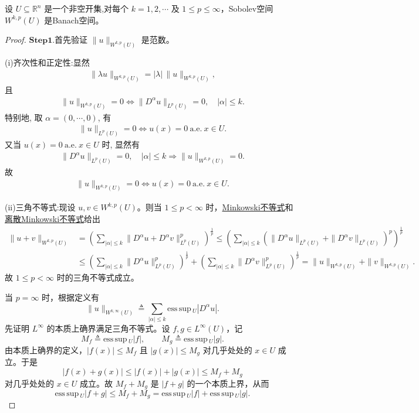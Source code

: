 \documentclass[../../main.tex]{subfiles}
\begin{document}
\begin{theorem}[Sobolev空间都是Banach空间]\label{theorem:ch05-WkpBanach}
设 $U \subseteq \mathbb{R}^n$ 是一个非空开集,对每个 $k=1,2,\cdots$ 及 $1\leqslant p\leqslant\infty$，Sobolev空间 $W^{k,p}(U)$ 是Banach空间。
\end{theorem}
\begin{proof}

\noindent$\mathbf{Step}\mathbf{1}.${\heiti 首先验证 $\|u\|_{W^{k,p}(U)}$ 是范数。}

(i)齐次性和正定性:显然
\begin{align*}
\|\lambda u\|_{W^{k,p}(U)}=|\lambda|\,\|u\|_{W^{k,p}(U)},
\end{align*}
且\begin{align*}
\|u\|_{W^{k,p}(U)}=0 \Longleftrightarrow \|D^{\alpha}u\|_{L^p(U)}=0,\quad |\alpha|\leqslant k.
\end{align*}
特别地, 取 $\alpha=(0,\cdots,0)$, 有
\begin{align*}
\|u\|_{L^p(U)}=0 \Longleftrightarrow u(x)=0\ \mathrm{a.e.}\ x\in U.
\end{align*}
又当 $u(x)=0\ \mathrm{a.e.}\ x\in U$ 时, 显然有
\begin{align*}
\|D^{\alpha}u\|_{L^p(U)}=0,\quad |\alpha|\leqslant k \Longrightarrow \|u\|_{W^{k,p}(U)}=0.
\end{align*}
故
\begin{align*}
\|u\|_{W^{k,p}(U)}=0 \Longleftrightarrow u(x)=0\ \mathrm{a.e.}\ x\in U.
\end{align*}

(ii)三角不等式:现设 $u,v\in W^{k,p}(U)$。则当 $1\leqslant p<\infty$ 时，\hyperref[Real Analysis-theorem:实变函数--Minkowski不等式]{Minkowski不等式}和\hyperref[Real Analysis-theorem:离散Minkowski不等式]{离散Minkowski不等式}给出
\begin{align*}
\|u+v\|_{W^{k,p}(U)}
&=\left(\sum_{|\alpha|\leqslant k}\|D^{\alpha}u+D^{\alpha}v\|_{L^{p}(U)}^{p}\right)^{\frac{1}{p}}\leqslant\left(\sum_{|\alpha|\leqslant k}\left(\|D^{\alpha}u\|_{L^{p}(U)}+\|D^{\alpha}v\|_{L^{p}(U)}\right)^{p}\right)^{\frac{1}{p}}\\
&\leqslant\left(\sum_{|\alpha|\leqslant k}\|D^{\alpha}u\|_{L^{p}(U)}^{p}\right)^{\frac{1}{p}}
+\left(\sum_{|\alpha|\leqslant k}\|D^{\alpha}v\|_{L^{p}(U)}^{p}\right)^{\frac{1}{p}}=\|u\|_{W^{k,p}(U)}+\|v\|_{W^{k,p}(U)}.
\end{align*}
故 \(1\leqslant p<\infty\) 时的三角不等式成立。

当 \(p=\infty\) 时，根据定义有
\[
\|u\|_{W^{k,\infty}(U)}
\triangleq \sum_{|\alpha|\leqslant k}\mathrm{ess}\,\mathrm{sup}\,_U |D^{\alpha}u|.
\]
先证明 \(L^{\infty}\) 的本质上确界满足三角不等式。设 \(f,g\in L^{\infty}(U)\)，记
\[
M_f\triangleq \mathrm{ess}\,\mathrm{sup}\,_U |f|,\qquad M_g\triangleq \mathrm{ess}\,\mathrm{sup}\,_U |g|.
\]
由本质上确界的定义，\(|f(x)|\leqslant M_f\) 且 \(|g(x)|\leqslant M_g\) 对几乎处处的 \(x\in U\) 成立。于是
\[
|f(x)+g(x)|\leqslant |f(x)|+|g(x)|\leqslant M_f+M_g
\]
对几乎处处的 \(x\in U\) 成立。故 \(M_f+M_g\) 是 \(|f+g|\) 的一个本质上界，从而
\[
\mathrm{ess}\,\mathrm{sup}\,_U |f+g|\leqslant M_f+M_g
=\mathrm{ess}\,\mathrm{sup}\,_U |f|+\mathrm{ess}\,\mathrm{sup}\,_U |g|.
\]


\end{proof}
\end{document}
